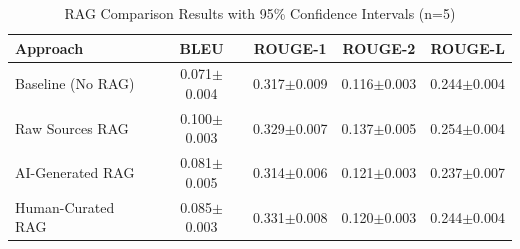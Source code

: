 \begin{table}[h]
\centering
\caption{RAG Comparison Results with 95\% Confidence Intervals (n=5)}
\label{tab:rag_comparison}
\begin{tabular}{@{}lcccc@{}}
\toprule
\textbf{Approach} & \textbf{BLEU} & \textbf{ROUGE-1} & \textbf{ROUGE-2} & \textbf{ROUGE-L} \\
\midrule
Baseline (No RAG) & 0.071$\pm$0.004 & 0.317$\pm$0.009 & 0.116$\pm$0.003 & 0.244$\pm$0.004 \\
Raw Sources RAG & 0.100$\pm$0.003 & 0.329$\pm$0.007 & 0.137$\pm$0.005 & 0.254$\pm$0.004 \\
AI-Generated RAG & 0.081$\pm$0.005 & 0.314$\pm$0.006 & 0.121$\pm$0.003 & 0.237$\pm$0.007 \\
Human-Curated RAG & 0.085$\pm$0.003 & 0.331$\pm$0.008 & 0.120$\pm$0.003 & 0.244$\pm$0.004 \\
\bottomrule
\end{tabular}
\end{table}